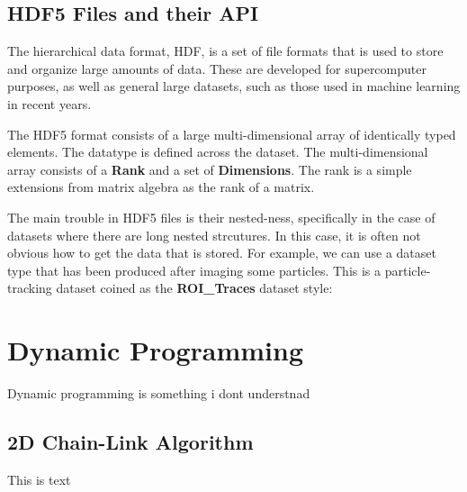 \subsection{HDF5 Files and their API}

The hierarchical data format, HDF, is a set of file formats that is used to store and organize large amounts of data. These are developed for supercomputer purposes, as well as general large datasets, such as those used in machine learning in recent years.

The HDF5 format consists of a large multi-dimensional array of identically typed elements. The datatype is defined across the dataset. The multi-dimensional array consists of a \textbf{Rank} and a set of \textbf{Dimensions}. The rank is a simple extensions from matrix algebra as the rank of a matrix.

The main trouble in HDF5 files is their nested-ness, specifically in the case of datasets where there are long nested strcutures. In this case, it is often not obvious how to get the data that is stored. For example, we can use a dataset type that has been produced after imaging some particles. This is a particle-tracking dataset coined as the \textbf{ROI\_Traces} dataset style:



\section{Dynamic Programming}
Dynamic programming is something i dont understnad\\

\subsection{2D Chain-Link Algorithm}
This is text

